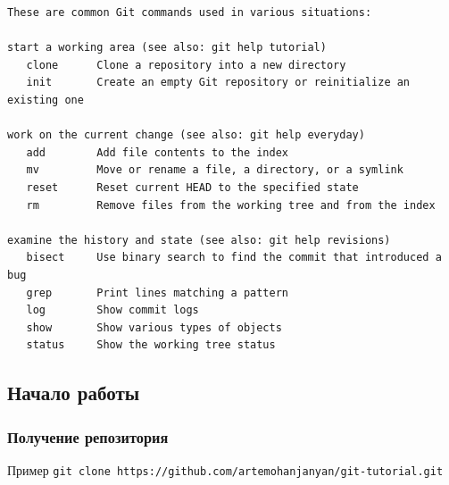 \documentclass[pdf,russian]{beamer}
\begin{document}
\begin{frame}[fragile]
\begin{Verbatim}[fontsize=\relsize{-3}]
These are common Git commands used in various situations:

start a working area (see also: git help tutorial)
   clone      Clone a repository into a new directory
   init       Create an empty Git repository or reinitialize an existing one

work on the current change (see also: git help everyday)
   add        Add file contents to the index
   mv         Move or rename a file, a directory, or a symlink
   reset      Reset current HEAD to the specified state
   rm         Remove files from the working tree and from the index

examine the history and state (see also: git help revisions)
   bisect     Use binary search to find the commit that introduced a bug
   grep       Print lines matching a pattern
   log        Show commit logs
   show       Show various types of objects
   status     Show the working tree status
    \end{Verbatim}
\end{frame}

\subsection{Начало работы}


\begin{frame}
    \frametitle{Получение репозитория}
    \begin{exampleblock}{Пример}
        \texttt{git clone https://github.com/artemohanjanyan/git-tutorial.git}
    \end{exampleblock}
\end{frame}
\end{document}
